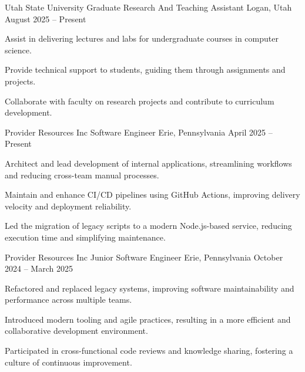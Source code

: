 \documentclass[10pt, a4paper]{russell}
\begin{document}
\begin{cventries}

    \cventry
        {Utah State University}
        {Graduate Research And Teaching Assistant}
        {Logan, Utah}
        {August 2025 – Present}
        {
            \begin{cvitems}
                \item Assist in delivering lectures and labs for undergraduate courses in computer science.
                \item Provide technical support to students, guiding them through assignments and projects.
                \item Collaborate with faculty on research projects and contribute to curriculum development.
            \end{cvitems}
        }

    \cventry
        {Provider Resources Inc}
        {Software Engineer}
        {Erie, Pennsylvania}
        {April 2025 – Present}
        {
            \begin{cvitems}
                \item Architect and lead development of internal applications, streamlining workflows and reducing cross-team manual processes.
                \item Maintain and enhance CI/CD pipelines using GitHub Actions, improving delivery velocity and deployment reliability.
                \item Led the migration of legacy scripts to a modern Node.js-based service, reducing execution time and simplifying maintenance.
            \end{cvitems}
        }

    \cventry
        {Provider Resources Inc}
        {Junior Software Engineer}
        {Erie, Pennsylvania}
        {October 2024 – March 2025}
        {
            \begin{cvitems}
                \item Refactored and replaced legacy systems, improving software maintainability and performance across multiple teams.
                \item Introduced modern tooling and agile practices, resulting in a more efficient and collaborative development environment.
                \item Participated in cross-functional code reviews and knowledge sharing, fostering a culture of continuous improvement.
            \end{cvitems}
        }

\end{cventries}
\end{document}
